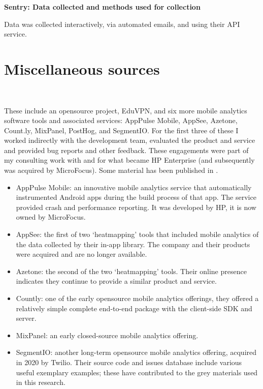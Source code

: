 \textbf{Sentry: Data collected and methods used for collection}

Data was collected interactively, via automated emails, and using their API service.





\section{Miscellaneous sources}~\label{section-case-study-misc-contributions}

These include an opensource project, EduVPN, and six more mobile analytics software tools and associated services: AppPulse Mobile, AppSee, Azetone, Count.ly, MixPanel, PostHog, and SegmentIO. For the first three of these I worked indirectly with the development team, evaluated the product and service and provided bug reports and other feedback. These engagements were part of my consulting work with and for what became HP Enterprise (and subsequently was acquired by MicroFocus). Some material has been published in .

\begin{itemize}
    \item AppPulse Mobile: an innovative mobile analytics service that automatically instrumented Android apps during the build process of that app. The service provided crash and performance reporting. It was developed by HP, it is now owned by MicroFocus. 
    \item AppSee: the first of two `heatmapping' tools that included mobile analytics of the data collected by their in-app library. The company and their products were acquired and are no longer available.
    \item Azetone: the second of the two `heatmapping' tools. Their online presence indicates they continue to provide a similar product and service.
    \item Countly: one of the early opensource mobile analytics offerings, they offered a relatively simple complete end-to-end package with the client-side SDK and server.
    \item MixPanel: an early closed-source mobile analytics offering.
    \item SegmentIO: another long-term opensource mobile analytics offering, acquired in 2020 by Twilio. Their source code and issues database include various useful exemplary examples; these have contributed to the grey materials used in this research. 
\end{itemize}



